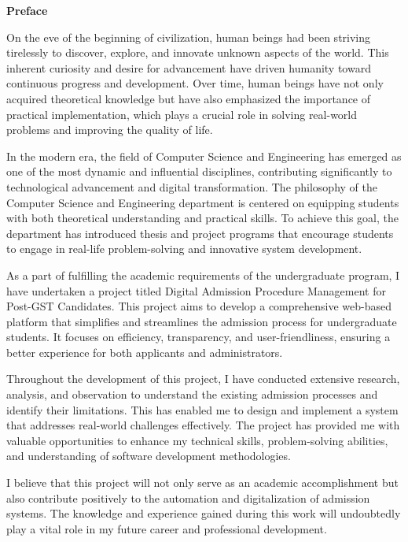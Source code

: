 
\newpage
\begin{center}
    \Large \textbf{Preface}
\end{center}

\vspace{0.7cm}

\noindent On the eve of the beginning of civilization, human beings had been striving tirelessly to discover, explore, and innovate unknown aspects of the world. This inherent curiosity and desire for advancement have driven humanity toward continuous progress and development. Over time, human beings have not only acquired theoretical knowledge but have also emphasized the importance of practical implementation, which plays a crucial role in solving real-world problems and improving the quality of life.

\vspace{0.5cm}

\noindent In the modern era, the field of Computer Science and Engineering has emerged as one of the most dynamic and influential disciplines, contributing significantly to technological advancement and digital transformation. The philosophy of the Computer Science and Engineering department is centered on equipping students with both theoretical understanding and practical skills. To achieve this goal, the department has introduced thesis and project programs that encourage students to engage in real-life problem-solving and innovative system development.

\vspace{0.5cm}

\noindent As a part of fulfilling the academic requirements of the undergraduate program, I have undertaken a project titled Digital Admission Procedure Management for Post-GST Candidates. This project aims to develop a comprehensive web-based platform that simplifies and streamlines the admission process for undergraduate students. It focuses on efficiency, transparency, and user-friendliness, ensuring a better experience for both applicants and administrators.

\vspace{0.5cm}

\noindent Throughout the development of this project, I have conducted extensive research, analysis, and observation to understand the existing admission processes and identify their limitations. This has enabled me to design and implement a system that addresses real-world challenges effectively. The project has provided me with valuable opportunities to enhance my technical skills, problem-solving abilities, and understanding of software development methodologies.

\vspace{0.5cm}

\noindent I believe that this project will not only serve as an academic accomplishment but also contribute positively to the automation and digitalization of admission systems. The knowledge and experience gained during this work will undoubtedly play a vital role in my future career and professional development.